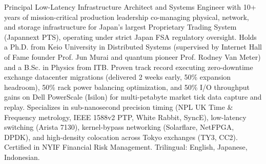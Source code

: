 

\begin{cvparagraph}

Principal Low-Latency Infrastructure Architect and Systems Engineer with 10+ years of mission-critical production leadership co-managing physical, network, and storage infrastructure for Japan's largest Proprietary Trading System (Japannext PTS), operating under strict Japan FSA regulatory oversight. Holds a Ph.D. from Keio University in Distributed Systems (supervised by Internet Hall of Fame founder Prof. Jun Murai and quantum pioneer Prof. Rodney Van Meter) and a B.Sc. in Physics from ITB. Proven track record executing zero-downtime exchange datacenter migrations (delivered 2 weeks early, 50\% expansion headroom), 50\% rack power balancing optimization, and 50\% I/O throughput gains on Dell PowerScale (Isilon) for multi-petabyte market tick data capture and replay. Specializes in sub-nanosecond precision timing (NPL UK Time \& Frequency metrology, IEEE 1588v2 PTP, White Rabbit, SyncE), low-latency switching (Arista 7130), kernel-bypass networking (Solarflare, NetFPGA, DPDK), and high-density colocation across Tokyo exchanges (TY3, CC2). Certified in NYIF Financial Risk Management. Trilingual: English, Japanese, Indonesian.
\end{cvparagraph}

